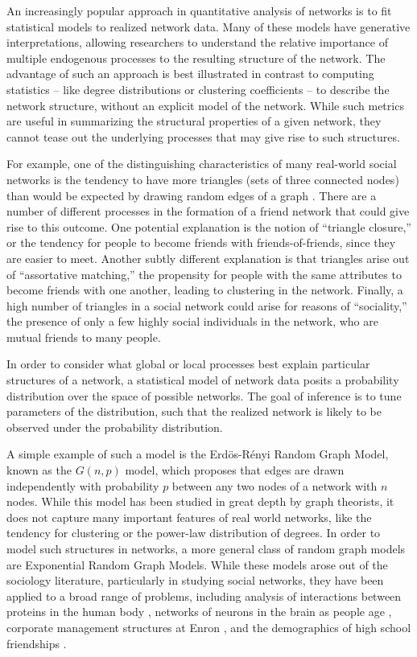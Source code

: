 
An increasingly popular approach in quantitative analysis of networks is to fit statistical models to realized network data. Many of these models have generative interpretations, allowing researchers to understand the relative importance of multiple endogenous processes to the resulting structure of the network. The advantage of such an approach is best illustrated in contrast to computing statistics -- like degree distributions or clustering coefficients -- to describe the network structure, without an explicit model of the network. While such metrics are useful in summarizing the structural properties of a given network, they cannot tease out the underlying processes that may give rise to such structures. 

For example, one of the distinguishing characteristics of many real-world social networks is the tendency to have more triangles (sets of three connected nodes) than would be expected by drawing random edges of a graph \cite{GKM09}. There are a number of different processes in the formation of a friend network that could give rise to this outcome. One potential explanation is the notion of ``triangle closure,'' or the tendency for people to become friends with friends-of-friends, since they are easier to meet. Another subtly different explanation is that triangles arise out of ``assortative matching,'' the propensity for people with the same attributes to become friends with one another, leading to clustering in the network. Finally, a high number of triangles in a social network could arise for reasons of ``sociality,''  the presence of only a few highly social individuals in the network, who are mutual friends to many people.

In order to consider what global or local processes best explain particular structures of a network, a statistical model of network data posits a probability distribution over the space of possible networks. The goal of inference  is to tune parameters of the distribution, such that the realized network is likely to be observed under the probability distribution. 

A simple example of such a model is the Erd\"{o}s-R\'{e}nyi Random Graph Model, known as the $G(n,p)$ model, which proposes that edges are drawn independently with probability $p$ between any two nodes of a network with $n$ nodes. While this model has been studied in great depth by graph theorists, it does not capture many important features of real world networks, like the tendency for clustering or the power-law distribution of degrees. In order to model such structures in networks, a more general class of random graph models are Exponential Random Graph Models. While these models arose out of the sociology literature, particularly in studying social networks, they have been applied to a broad range of problems, including analysis of interactions between proteins in the human body \cite{EBB10}, networks of neurons in the brain as people age  \cite{Sin+16}, corporate management structures at Enron  \cite{UHH13}, and the demographics of high school friendships \cite{GKM09}. 

